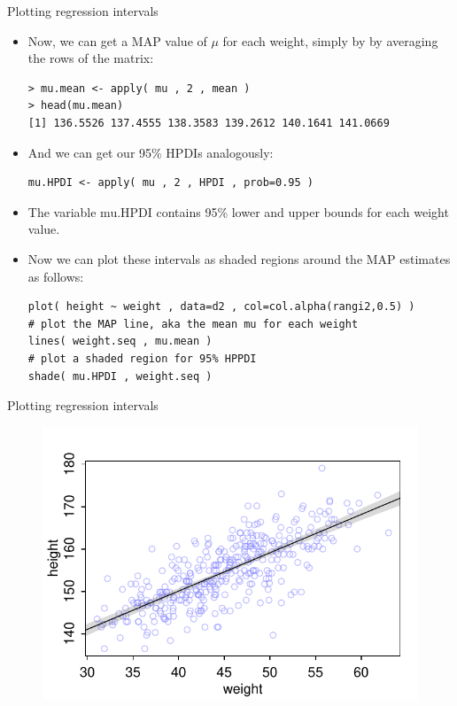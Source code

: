 \documentclass[handout]{beamer}
\begin{document}
\begin{frame}[fragile]{Plotting regression intervals}
\scriptsize{
\begin{itemize}


\item Now, we can get a MAP value of $\mu$ for each weight, simply by by averaging the rows of the matrix:

\begin{verbatim}
> mu.mean <- apply( mu , 2 , mean )
> head(mu.mean)
[1] 136.5526 137.4555 138.3583 139.2612 140.1641 141.0669
\end{verbatim}

\item And we can get our 95\% HPDIs analogously:

\begin{verbatim}
mu.HPDI <- apply( mu , 2 , HPDI , prob=0.95 ) 
\end{verbatim}

\item The variable mu.HPDI contains 95\% lower and upper bounds for each weight value.

\item Now we can plot these intervals as shaded regions around the MAP estimates as follows:

\begin{verbatim}
plot( height ~ weight , data=d2 , col=col.alpha(rangi2,0.5) )
# plot the MAP line, aka the mean mu for each weight
lines( weight.seq , mu.mean )
# plot a shaded region for 95% HPPDI
shade( mu.HPDI , weight.seq ) 
\end{verbatim}


\end{itemize}
 

 
}
\end{frame}


\begin{frame}{Plotting regression intervals}

\begin{figure}[h!]
	\centering
	\includegraphics[scale=0.9]{pics/height_interval.pdf}
\end{figure}

\end{frame}
\end{document}
